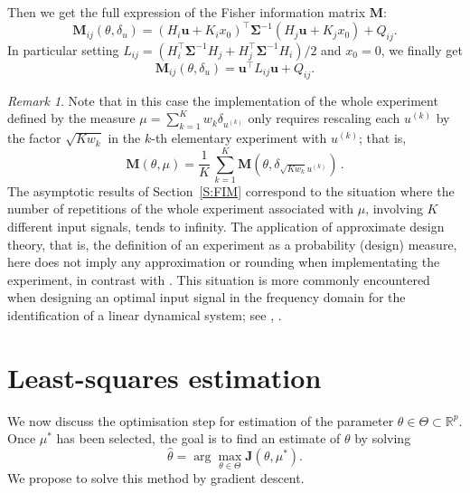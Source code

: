 \documentclass[twocolumn]{autart}
\theoremstyle{definition}
\theoremstyle{remark}
\newtheorem{remark}[theorem]{Remark}
\newcommand{\R}{\mathbb{R}}
\newcommand{\V}{\mathcal{V}}
\newcommand{\ub}{\mathbf{u}}
\newcommand{\Jb}{\mathbf{J}}
\newcommand{\Mb}{\mathbf{M}}
\newcommand{\Sigmab}{\boldsymbol{\Sigma}}
\begin{document}
Then we get the full expression of the Fisher information matrix $\Mb$:
\begin{equation}
    \Mb_{ij}(\theta,\delta_{u})
    =
    \left(H_i \ub + K_i x_0\right)^\top \Sigmab^{-1}\left(H_j \ub + K_j x_0\right) + Q_{ij}.
\end{equation}
In particular setting $L_{ij}=(H_i^\top \Sigmab^{-1} H_j+H_j^\top \Sigmab^{-1} H_i)/2$ and $x_0=0$,
we finally get
\begin{equation}
    \Mb_{ij}(\theta,\delta_{u})
    =
    \ub^\top L_{ij} \ub+ Q_{ij}.
\end{equation}


\begin{remark}\label{R:approximate-design}
Note that in this case the implementation of the whole experiment defined by the measure $\mu=\sum_{k=1}^K w_k\delta_{u^{(k)}}$ only requires rescaling each $u^{(k)}$ by the factor $\sqrt{Kw_k}$ in the $k$-th elementary experiment with $u^{(k)}$; that is,
$$
\Mb(\theta,\mu) = \frac1K\, \sum_{k=1}^K \Mb(\theta,\delta_{\sqrt{Kw_k}u^{(k)}}) \,.
$$
The asymptotic results of Section~\ref{S:FIM} correspond to the situation where the number of repetitions of the whole experiment associated with $\mu$, involving $K$ different input signals, tends to infinity.
%
The application of approximate design theory, that is, the definition of an experiment as a probability (design) measure, here does not imply any approximation or rounding when implementating the experiment, in contrast with \cite{PukelsheimR92}. This situation is more commonly encountered when designing an optimal input signal in the frequency domain for the identification of a linear dynamical system; see \cite[Chap.~6]{GoodwinP77}, \cite{Zarrop79}.
\end{remark}


\section{Least-squares estimation}

We now discuss the optimisation step for estimation of the parameter $\theta\in \Theta\subset \R^p$. Once $\mu^*$ has been selected, the goal is to find an estimate of $\theta$ by solving 
\begin{equation}
    \hat \theta=\arg\max_{\theta\in \Theta}\Jb(\theta,\mu^*).
\end{equation}
We propose to solve this method by gradient descent.
\end{document}
